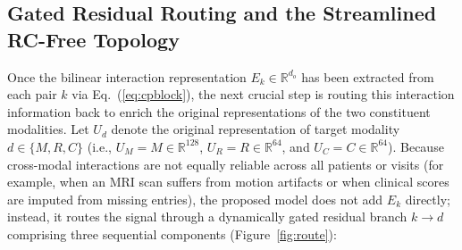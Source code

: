 \subsection{Gated Residual Routing and the Streamlined RC-Free Topology}
\label{sec:gated-routing}
\label{sec:rcfree-method}
Once the bilinear interaction representation $E_k\in\mathbb R^{d_o}$ has been extracted from each pair $k$ via Eq.~(\ref{eq:cpblock}), the next crucial step is routing this interaction information back to enrich the original representations of the two constituent modalities. Let $U_d$ denote the original representation of target modality $d\in\{M,R,C\}$ (i.e., $U_M=M\in\mathbb R^{128}$, $U_R=R\in\mathbb R^{64}$, and $U_C=C\in\mathbb R^{64}$). Because cross-modal interactions are not equally reliable across all patients or visits (for example, when an MRI scan suffers from motion artifacts or when clinical scores are imputed from missing entries), the proposed model does not add $E_k$ directly; instead, it routes the signal through a dynamically gated residual branch $k\to d$ comprising three sequential components (Figure~\ref{fig:route}):
